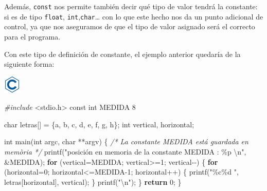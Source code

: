 \documentclass[
]{book}
\newenvironment{Shaded}{\begin{snugshade}}{\end{snugshade}}
\newcommand{\CharTok}[1]{\textcolor[rgb]{0.31,0.60,0.02}{#1}}
\newcommand{\CommentTok}[1]{\textcolor[rgb]{0.56,0.35,0.01}{\textit{#1}}}
\newcommand{\ControlFlowTok}[1]{\textcolor[rgb]{0.13,0.29,0.53}{\textbf{#1}}}
\newcommand{\DataTypeTok}[1]{\textcolor[rgb]{0.13,0.29,0.53}{#1}}
\newcommand{\DecValTok}[1]{\textcolor[rgb]{0.00,0.00,0.81}{#1}}
\newcommand{\ImportTok}[1]{#1}
\newcommand{\NormalTok}[1]{#1}
\newcommand{\PreprocessorTok}[1]{\textcolor[rgb]{0.56,0.35,0.01}{\textit{#1}}}
\newcommand{\SpecialCharTok}[1]{\textcolor[rgb]{0.00,0.00,0.00}{#1}}
\newcommand{\StringTok}[1]{\textcolor[rgb]{0.31,0.60,0.02}{#1}}
\begin{document}
Además, \texttt{const} nos permite también decir qué tipo de valor tendrá la constante: si es de tipo \texttt{float}, \texttt{int},\texttt{char}\ldots{} con lo que este hecho nos da un punto adicional de control, ya que nos aseguramos de que el tipo de valor asignado será el correcto para el programa.

Con este tipo de definición de constante, el ejemplo anterior quedaría de la siguiente forma:

\includegraphics{./img/c.png}

\begin{Shaded}
\begin{Highlighting}[]
\PreprocessorTok{\#include }\ImportTok{\textless{}stdio.h\textgreater{}}
\DataTypeTok{const} \DataTypeTok{int}\NormalTok{ MEDIDA }\DecValTok{8}

\DataTypeTok{char}\NormalTok{ letras[] = \{}\CharTok{\textquotesingle{}a\textquotesingle{}}\NormalTok{, }\CharTok{\textquotesingle{}b\textquotesingle{}}\NormalTok{, }\CharTok{\textquotesingle{}c\textquotesingle{}}\NormalTok{, }\CharTok{\textquotesingle{}d\textquotesingle{}}\NormalTok{, }\CharTok{\textquotesingle{}e\textquotesingle{}}\NormalTok{, }\CharTok{\textquotesingle{}f\textquotesingle{}}\NormalTok{, }\CharTok{\textquotesingle{}g\textquotesingle{}}\NormalTok{, }\CharTok{\textquotesingle{}h\textquotesingle{}}\NormalTok{\};}
\DataTypeTok{int}\NormalTok{ vertical, horizontal;}

\DataTypeTok{int}\NormalTok{ main(}\DataTypeTok{int}\NormalTok{ argc, }\DataTypeTok{char}\NormalTok{ **argv) \{}
    \CommentTok{/* La constante MEDIDA está guardada en memòria */}
\NormalTok{    printf(}\StringTok{"posición en memoria de la constante MEDIDA : \%p }\SpecialCharTok{\textbackslash{}n}\StringTok{"}\NormalTok{, \&MEDIDA);}
    \ControlFlowTok{for}\NormalTok{ (vertical=MEDIDA; vertical\textgreater{}=}\DecValTok{1}\NormalTok{; vertical{-}{-}) \{}
        \ControlFlowTok{for}\NormalTok{ (horizontal=}\DecValTok{0}\NormalTok{; horizontal\textless{}=MEDIDA{-}}\DecValTok{1}\NormalTok{; horizontal++) \{}
\NormalTok{            printf(}\StringTok{"\%c\%d "}\NormalTok{, letras[horizontal], vertical);}
\NormalTok{        \}}
\NormalTok{        printf(}\StringTok{"}\SpecialCharTok{\textbackslash{}n}\StringTok{"}\NormalTok{);}
\NormalTok{    \}}
    \ControlFlowTok{return} \DecValTok{0}\NormalTok{;}
\NormalTok{\}}
\end{Highlighting}
\end{Shaded}
\end{document}
